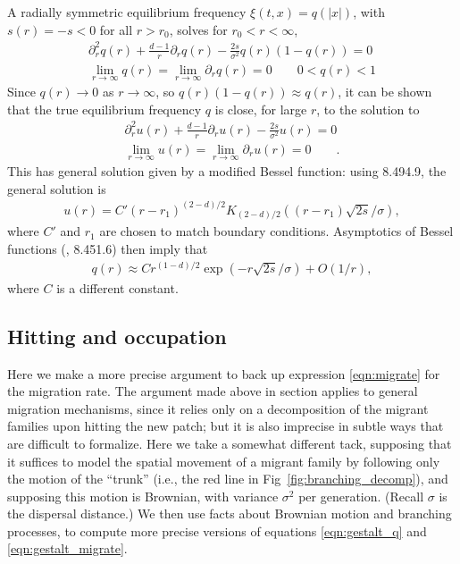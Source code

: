 \documentclass[10pt,letterpaper]{article}
\newcommand{\citet}[1]{\cite{#1}}
\newcommand{\secref}[1]{{\emph{\nameref{#1}}}}
\begin{document}
A radially symmetric equilibrium frequency $\xi(t,x)=q(|x|)$,
with $s(r) = -s < 0$ for all $r>r_0$,
solves for $r_0 < r < \infty$,
\begin{align} \label{eqn:radial_eqfreq_diffeq}
    \partial_r^2 q(r) + \frac{d-1}{r} \partial_r q(r) - \frac{2s}{\sigma^2} q(r) (1-q(r)) = 0 \\
    \lim_{r \to \infty} q(r) = \lim_{r \to \infty} \partial_r q(r) = 0 \qquad 
    0 < q(r) < 1 
\end{align}
Since $q(r) \to 0$ as $r \to \infty$, so $q(r) (1-q(r)) \approx q(r)$,
it can be shown 
that the true equilibrium frequency $q$ is close, for large $r$, to the solution to
\begin{align}
    \partial_r^2 u(r) + \frac{d-1}{r} \partial_r u(r) - \frac{2s}{\sigma^2} u(r) = 0  \label{eqn:bessel} \\
    \lim_{r \to \infty} u(r) = \lim_{r \to \infty} \partial_r u(r) = 0 \qquad  .
\end{align}
This has general solution given by a modified Bessel function:
using \citet{gradshteyn2007table} 8.494.9,
the general solution is
\begin{align}
    u(r) = C' (r-r_1)^{(2-d)/2} K_{(2-d)/2} \left( (r-r_1) \sqrt{2s}/\sigma \right) ,
\end{align}
where $C'$ and $r_1$ are chosen to match boundary conditions.
Asymptotics of Bessel functions (\citet{gradshteyn2007table}, 8.451.6) then imply that
\begin{align}
    q(r) \approx C r^{(1-d)/2} \exp \left( -r \sqrt{2s}/\sigma \right) + O(1/r),
\end{align}
where $C$ is a different constant.



\subsection*{Hitting and occupation}
\label{ss:hitting_occupation}

Here we make a more precise argument to back up expression \eqref{eqn:migrate} for the migration rate.
The argument made above in section \secref{ss:heuristics} applies to general migration mechanisms,
since it relies only on a decomposition of the migrant families upon hitting the new patch;
but it is also imprecise in subtle ways
that are difficult to formalize.
Here we take a somewhat different tack,
supposing that it suffices to model the spatial movement of a migrant family
by following only the motion of the ``trunk''
(i.e., the red line in Fig~\ref{fig:branching_decomp}),
and supposing this motion is Brownian, with variance $\sigma^2$ per generation.
(Recall $\sigma$ is the dispersal distance.)
We then use facts about Brownian motion and branching processes, 
to compute more precise versions of equations \eqref{eqn:gestalt_q} and \eqref{eqn:gestalt_migrate}.
\end{document}
